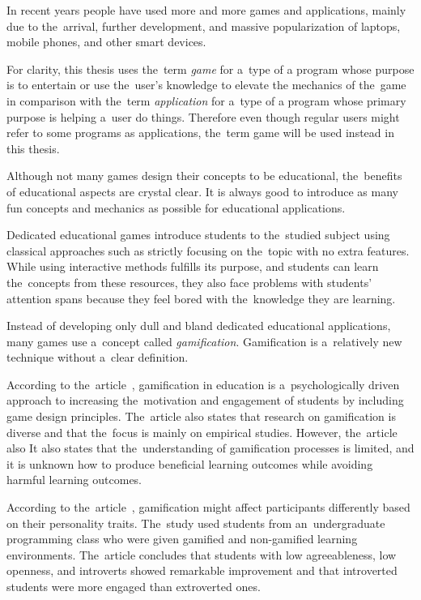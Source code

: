 In recent years people have used more and more games and applications, mainly due to the~arrival, further development, and massive popularization of laptops, mobile phones, and other smart devices.

For clarity, this thesis uses the~term \emph{game} for a~type of a program whose purpose is to entertain or use the~user's knowledge to elevate the mechanics of the~game in comparison with the~term \emph{application} for a~type of a program whose primary purpose is helping a~user do things.
Therefore even though regular users might refer to some programs as applications, the~term game will be used instead in this thesis.

Although not many games design their concepts to be educational, the~benefits of educational aspects are crystal clear.
It is always good to introduce as many fun concepts and mechanics as possible for educational applications.

Dedicated educational games introduce students to the~studied subject using classical approaches such as strictly focusing on the~topic with no extra features.
While using interactive methods fulfills its purpose, and students can learn the~concepts from these resources, they also face problems with students' attention spans because they feel bored with the~knowledge they are learning.

Instead of developing only dull and bland dedicated educational applications, many games use a~concept called \emph{gamification}.
Gamification is a~relatively new technique without a~clear definition.

According to the~article~\cite{dichev_2017_gamifying}, gamification in education is a~psychologically driven approach to increasing the~motivation and engagement of students by including game design principles.
The~article also states that research on gamification is diverse and that the~focus is mainly on empirical studies. However, the~article also 
It also states that the~understanding of gamification processes is limited, and it is unknown how to produce beneficial learning outcomes while avoiding harmful learning outcomes. 

According to the~article~\cite{smiderle_2020_the}, gamification might affect participants differently based on their personality traits.
The~study used students from an~undergraduate programming class who were given gamified and non-gamified learning environments.
The~article concludes that students with low agreeableness, low openness, and introverts showed remarkable improvement and that introverted students were more engaged than extroverted ones.

